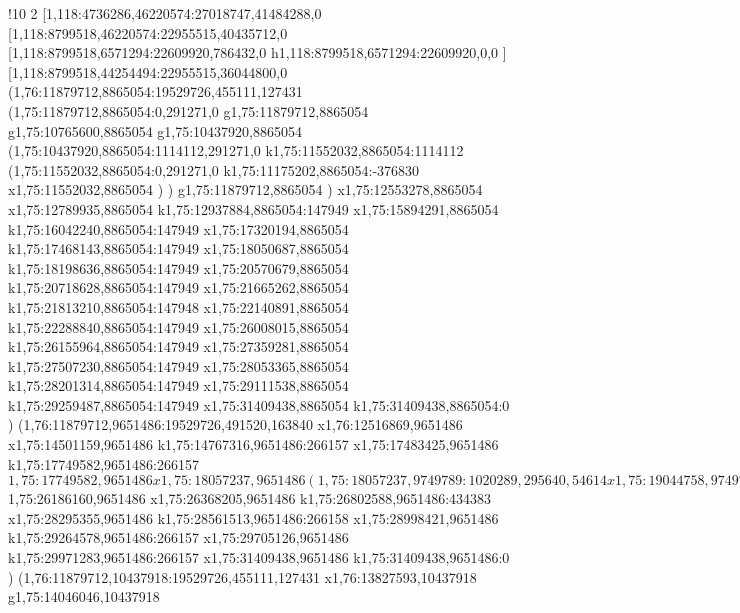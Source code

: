 !10
{2
[1,118:4736286,46220574:27018747,41484288,0
[1,118:8799518,46220574:22955515,40435712,0
[1,118:8799518,6571294:22609920,786432,0
h1,118:8799518,6571294:22609920,0,0
]
[1,118:8799518,44254494:22955515,36044800,0
(1,76:11879712,8865054:19529726,455111,127431
(1,75:11879712,8865054:0,291271,0
g1,75:11879712,8865054
g1,75:10765600,8865054
g1,75:10437920,8865054
(1,75:10437920,8865054:1114112,291271,0
k1,75:11552032,8865054:1114112
(1,75:11552032,8865054:0,291271,0
k1,75:11175202,8865054:-376830
x1,75:11552032,8865054
)
)
g1,75:11879712,8865054
)
x1,75:12553278,8865054
x1,75:12789935,8865054
k1,75:12937884,8865054:147949
x1,75:15894291,8865054
k1,75:16042240,8865054:147949
x1,75:17320194,8865054
k1,75:17468143,8865054:147949
x1,75:18050687,8865054
k1,75:18198636,8865054:147949
x1,75:20570679,8865054
k1,75:20718628,8865054:147949
x1,75:21665262,8865054
k1,75:21813210,8865054:147948
x1,75:22140891,8865054
k1,75:22288840,8865054:147949
x1,75:26008015,8865054
k1,75:26155964,8865054:147949
x1,75:27359281,8865054
k1,75:27507230,8865054:147949
x1,75:28053365,8865054
k1,75:28201314,8865054:147949
x1,75:29111538,8865054
k1,75:29259487,8865054:147949
x1,75:31409438,8865054
k1,75:31409438,8865054:0
)
(1,76:11879712,9651486:19529726,491520,163840
x1,76:12516869,9651486
x1,75:14501159,9651486
k1,75:14767316,9651486:266157
x1,75:17483425,9651486
k1,75:17749582,9651486:266157
$1,75:17749582,9651486
x1,75:18057237,9651486
(1,75:18057237,9749789:1020289,295640,54614
x1,75:19044758,9749789
)
k1,75:19339072,9651486:261546
x1,75:19848798,9651486
k1,75:20110344,9651486:261546
x1,75:20417999,9651486
(1,75:20417999,9749789:356734,197518,0
x1,75:20741965,9749789
)
k1,75:20952167,9651486:177434
x1,75:21461893,9651486
k1,75:21639327,9651486:177434
x1,75:21905340,9651486
(1,75:21905340,9749789:356734,197518,0
x1,75:22229306,9749789
)
x1,75:22574660,9651486
x1,75:23160691,9651486
(1,75:23160691,9749789:356734,197518,0
x1,75:23484657,9749789
)
x1,75:23772288,9651486
k1,75:23949722,9651486:177434
x1,75:24459448,9651486
k1,75:24636883,9651486:177435
x1,75:24902896,9651486
(1,75:24902896,9749789:356734,197518,0
x1,75:25226862,9749789
)
x1,75:25829426,9651486
(1,75:25829426,9749789:356734,197518,0
x1,75:26153392,9749789
)
$1,75:26186160,9651486
x1,75:26368205,9651486
k1,75:26802588,9651486:434383
x1,75:28295355,9651486
k1,75:28561513,9651486:266158
x1,75:28998421,9651486
k1,75:29264578,9651486:266157
x1,75:29705126,9651486
k1,75:29971283,9651486:266157
x1,75:31409438,9651486
k1,75:31409438,9651486:0
)
(1,76:11879712,10437918:19529726,455111,127431
x1,76:13827593,10437918
g1,75:14046046,10437918
}
